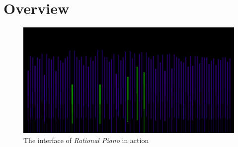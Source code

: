\documentclass[12pt,a4paper,titlepage,oneside]{report}
\begin{document}
\maketitle

\tableofcontents
\newpage
\listoffigures
\newpage
\listoftables
\newpage


\chapter{Overview}
\label{chap:overview}

\begin{figure}[htbp]
\includegraphics[width=\textwidth]{images/interface_active2.png}
\centering
\caption{The interface of \emph{Rational Piano} in action}
\label{fig:interface_active}
\end{figure}
\end{document}

